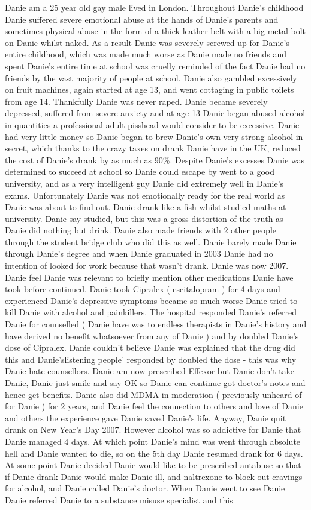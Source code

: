 \documentclass[12pt]{book}
\begin{document}
Danie am a 25 year old gay male lived in London. Throughout Danie's childhood Danie suffered severe emotional abuse at the hands of Danie's parents and sometimes physical abuse in the form of a thick leather belt with a big metal bolt on Danie whilst naked. As a result Danie was severely screwed up for Danie's entire childhood, which was made much worse as Danie made no friends and spent Danie's entire time at school was cruelly reminded of the fact Danie had no friends by the vast majority of people at school. Danie also gambled excessively on fruit machines, again started at age 13, and went cottaging in public toilets from age 14. Thankfully Danie was never raped. Danie became severely depressed, suffered from severe anxiety and at age 13 Danie began abused alcohol in quantities a professional adult pisshead would consider to be excessive. Danie had very little money so Danie began to brew Danie's own very strong alcohol in secret, which thanks to the crazy taxes on drank Danie have in the UK, reduced the cost of Danie's drank by as much as 90\%. Despite Danie's excesses Danie was determined to succeed at school so Danie could escape by went to a good university, and as a very intelligent guy Danie did extremely well in Danie's exams. Unfortunately Danie was not emotionally ready for the real world as Danie was about to find out. Danie drank like a fish whilst studied maths at university. Danie say studied, but this was a gross distortion of the truth as Danie did nothing but drink. Danie also made friends with 2 other people through the student bridge club who did this as well. Danie barely made Danie through Danie's degree and when Danie graduated in 2003 Danie had no intention of looked for work because that wasn't drank. Danie was now 2007. Danie feel Danie was relevant to briefly mention other medications Danie have took before continued. Danie took Cipralex ( escitalopram ) for 4 days and experienced Danie's depressive symptoms became so much worse Danie tried to kill Danie with alcohol and painkillers. The hospital responded Danie's referred Danie for counselled ( Danie have was to endless therapists in Danie's history and have derived no benefit whatsoever from any of Danie ) and by doubled Danie's dose of Cipralex. Danie couldn't believe Danie was explained that the drug did this and Danie'slistening people' responded by doubled the dose - this was why Danie hate counsellors. Danie am now prescribed Effexor but Danie don't take Danie, Danie just smile and say OK so Danie can continue got doctor's notes and hence get benefits. Danie also did MDMA in moderation ( previously unheard of for Danie ) for 2 years, and Danie feel the connection to others and love of Danie and others the experience gave Danie saved Danie's life. Anyway, Danie quit drank on New Year's Day 2007. However alcohol was so addictive for Danie that Danie managed 4 days. At which point Danie's mind was went through absolute hell and Danie wanted to die, so on the 5th day Danie resumed drank for 6 days. At some point Danie decided Danie would like to be prescribed antabuse so that if Danie drank Danie would make Danie ill, and naltrexone to block out cravings for alcohol, and Danie called Danie's doctor. When Danie went to see Danie Danie referred Danie to a substance misuse specialist and this 
\end{document}
